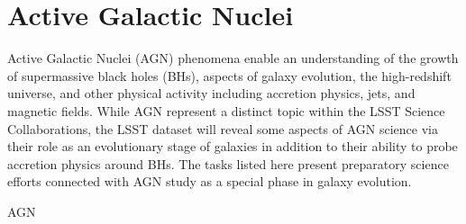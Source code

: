 \section{Active Galactic Nuclei}\label{sec:tasks:agn:intro} {\justify


Active Galactic Nuclei (AGN) phenomena enable an understanding of
the growth of supermassive black holes (BHs), aspects of galaxy evolution, the high-redshift universe, 
and other physical activity including accretion physics, jets, and magnetic fields.  
While AGN represent a distinct topic within the LSST Science Collaborations, the LSST
dataset will reveal some aspects of AGN science via their role as an
evolutionary stage of galaxies in addition to their ability to probe accretion physics around BHs.
The tasks listed here present preparatory science efforts connected with AGN study as a special
phase in galaxy evolution.


\begin{tasklist}{AGN}

\end{tasklist}}
